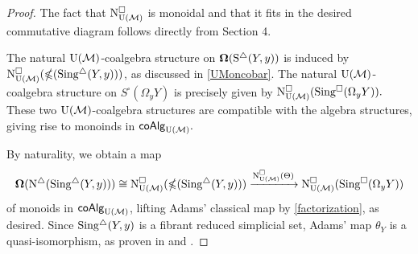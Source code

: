 \begin{proof}
The fact that $\cchainsUM$ is monoidal and that it fits in the desired commutative diagram follows directly from Section 4. 
    
The natural $\UM$-coalgebra structure on $\cobar(\sS(Y, y))$ is induced by $\cchainsUM ( \gcobar (\sSing(Y,y)) )$, as discussed in \ref{UMoncobar}. The natural $\UM$-coalgebra structure on $S^{\square}(\Omega_yY)$ is precisely given by $\cchainsUM( \cSing(\Omega_yY) ).$ These two $\UM$-coalgebra structures are compatible with the algebra structures, giving rise to monoinds in $\coAlg_{\UM}.$
     
By naturality, we obtain a map
     $$ \cobar(\schains(\sSing(Y,y))) \cong \cchainsUM ( \gcobar (\sSing(Y,y)) ) \xrightarrow{ \cchainsUM(\Theta)} \cchainsUM( \cSing(\Omega_yY) )$$
of monoids in $\coAlg_{\UM}$,  lifting Adams' classical map by \ref{factorization}, as desired. Since $\sSing(Y,y)$ is a fibrant reduced simplicial set, Adams' map $\theta_Y$ is a quasi-isomorphism, as proven in \cite{rivera2018cubical} and \cite{rivera2019path}.  
\end{proof}
